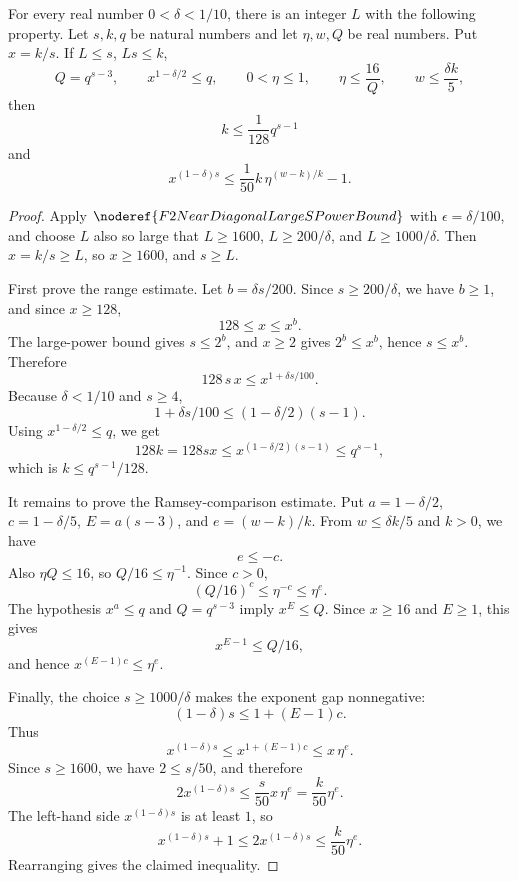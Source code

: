 \begin{helper}
For every real number \(0<\delta<1/10\), there is an integer \(L\) with the
following property.  Let \(s,k,q\) be natural numbers and let
\(\eta,w,Q\) be real numbers.  Put \(x=k/s\).  If \(L\le s\), \(Ls\le k\),
\[
  Q=q^{s-3},\qquad x^{1-\delta/2}\le q,\qquad
  0<\eta\le 1,\qquad \eta\le \frac{16}{Q},\qquad
  w\le \frac{\delta k}{5},
\]
then
\[
  k\le \frac{1}{128}q^{s-1}
\]
and
\[
  x^{(1-\delta)s}\le
  \frac{1}{50}k\,\eta^{(w-k)/k}-1 .
\]
\end{helper}
\begin{proof}
Apply \(\noderef{F2NearDiagonalLargeSPowerBound}\) with
\(\epsilon=\delta/100\), and choose \(L\) also so large that
\(L\ge 1600\), \(L\ge 200/\delta\), and \(L\ge 1000/\delta\).  Then
\(x=k/s\ge L\), so \(x\ge 1600\), and \(s\ge L\).

First prove the range estimate.  Let \(b=\delta s/200\).  Since
\(s\ge 200/\delta\), we have \(b\ge 1\), and since \(x\ge 128\),
\[
  128\le x\le x^b .
\]
The large-power bound gives \(s\le 2^b\), and \(x\ge2\) gives
\(2^b\le x^b\), hence \(s\le x^b\).  Therefore
\[
  128\,s\,x\le x^{1+\delta s/100}.
\]
Because \(\delta<1/10\) and \(s\ge4\),
\[
  1+\delta s/100\le (1-\delta/2)(s-1).
\]
Using \(x^{1-\delta/2}\le q\), we get
\[
  128k=128sx\le x^{(1-\delta/2)(s-1)}\le q^{s-1},
\]
which is \(k\le q^{s-1}/128\).

It remains to prove the Ramsey-comparison estimate.  Put
\(a=1-\delta/2\), \(c=1-\delta/5\), \(E=a(s-3)\), and
\(e=(w-k)/k\).  From \(w\le\delta k/5\) and \(k>0\), we have
\[
  e\le -c .
\]
Also \(\eta Q\le16\), so \(Q/16\le\eta^{-1}\).  Since \(c>0\),
\[
  (Q/16)^c\le \eta^{-c}\le \eta^e .
\]
The hypothesis \(x^a\le q\) and \(Q=q^{s-3}\) imply \(x^E\le Q\).  Since
\(x\ge16\) and \(E\ge1\), this gives
\[
  x^{E-1}\le Q/16,
\]
and hence \(x^{(E-1)c}\le\eta^e\).

Finally, the choice \(s\ge1000/\delta\) makes the exponent gap nonnegative:
\[
  (1-\delta)s\le 1+(E-1)c.
\]
Thus
\[
  x^{(1-\delta)s}\le x^{1+(E-1)c}\le x\,\eta^e.
\]
Since \(s\ge1600\), we have \(2\le s/50\), and therefore
\[
  2x^{(1-\delta)s}\le \frac{s}{50}x\,\eta^e
    =\frac{k}{50}\eta^e .
\]
The left-hand side \(x^{(1-\delta)s}\) is at least \(1\), so
\[
  x^{(1-\delta)s}+1\le 2x^{(1-\delta)s}
    \le \frac{k}{50}\eta^e .
\]
Rearranging gives the claimed inequality.
\end{proof}
